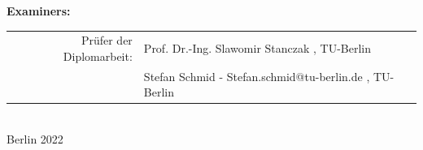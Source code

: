 \begin{titlepage}
\begin{center}
    \vspace{1cm}

    \large \textbf{Examiners:}

    \vspace{.2cm}

		\begin{tabular}{rl}
		Pr\"ufer der Diplomarbeit:	&Prof. Dr.-Ing. Slawomir Stanczak
, TU-Berlin\\
						& Stefan Schmid - Stefan.schmid@tu-berlin.de
, TU-Berlin\\
		\end{tabular}\\

    \vspace{2cm}
    \vspace{0.5cm}
    \large Berlin 2022\\

  \end{center}
\end{titlepage}
